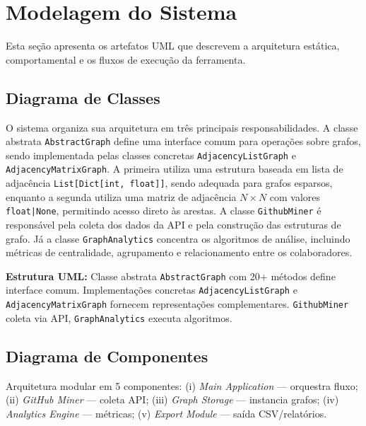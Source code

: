 \documentclass[12pt]{article}
\begin{document}
\section{Modelagem do Sistema}\label{sec:modelagem_sistema}

Esta seção apresenta os artefatos UML que descrevem a arquitetura estática, comportamental e os fluxos de execução da ferramenta.

\subsection{Diagrama de Classes}

O sistema organiza sua arquitetura em três principais responsabilidades. A classe abstrata \texttt{AbstractGraph} define uma interface comum para operações sobre grafos, sendo implementada pelas classes concretas \texttt{AdjacencyListGraph} e \texttt{AdjacencyMatrixGraph}. A primeira utiliza uma estrutura baseada em lista de adjacência \texttt{List[Dict[int, float]]}, sendo adequada para grafos esparsos, enquanto a segunda utiliza uma matriz de adjacência $N \times N$ com valores \texttt{float|None}, permitindo acesso direto às arestas. A classe \texttt{GithubMiner} é responsável pela coleta dos dados da API e pela construção das estruturas de grafo. Já a classe \texttt{GraphAnalytics} concentra os algoritmos de análise, incluindo métricas de centralidade, agrupamento e relacionamento entre os colaboradores.

\textbf{Estrutura UML:} Classe abstrata \texttt{AbstractGraph} com 20+ métodos define interface comum. Implementações concretas \texttt{AdjacencyListGraph} e \texttt{AdjacencyMatrixGraph} fornecem representações complementares. \texttt{GithubMiner} coleta via API, \texttt{GraphAnalytics} executa algoritmos.

\subsection{Diagrama de Componentes}

Arquitetura modular em 5 componentes: (i) \textit{Main Application} --- orquestra fluxo; (ii) \textit{GitHub Miner} --- coleta API; (iii) \textit{Graph Storage} --- instancia grafos; (iv) \textit{Analytics Engine} --- métricas; (v) \textit{Export Module} --- saída CSV/relatórios.
\end{document}
